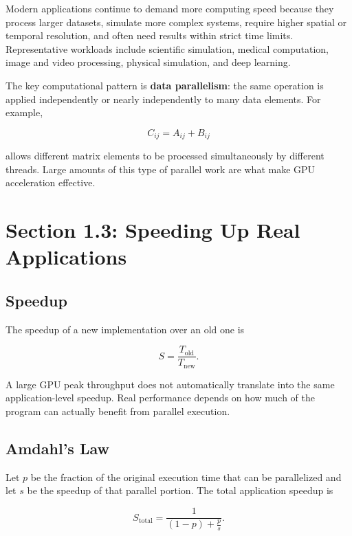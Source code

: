 \documentclass[11pt,a4paper]{article}
\begin{document}
Modern applications continue to demand more computing speed because they process larger datasets, simulate more complex systems, require higher spatial or temporal resolution, and often need results within strict time limits. Representative workloads include scientific simulation, medical computation, image and video processing, physical simulation, and deep learning.

The key computational pattern is \textbf{data parallelism}: the same operation is applied independently or nearly independently to many data elements. For example,

\begin{equation}
C_{ij}=A_{ij}+B_{ij}
\end{equation}

allows different matrix elements to be processed simultaneously by different threads. Large amounts of this type of parallel work are what make GPU acceleration effective.

\section{Section 1.3: Speeding Up Real Applications}

\subsection{Speedup}

The speedup of a new implementation over an old one is

\begin{equation}
S=\frac{T_{\mathrm{old}}}{T_{\mathrm{new}}}.
\end{equation}

A large GPU peak throughput does not automatically translate into the same application-level speedup. Real performance depends on how much of the program can actually benefit from parallel execution.

\subsection{Amdahl's Law}

Let $p$ be the fraction of the original execution time that can be parallelized and let $s$ be the speedup of that parallel portion. The total application speedup is

\begin{equation}
S_{\mathrm{total}}
=
\frac{1}{(1-p)+\frac{p}{s}}.
\end{equation}
\end{document}
